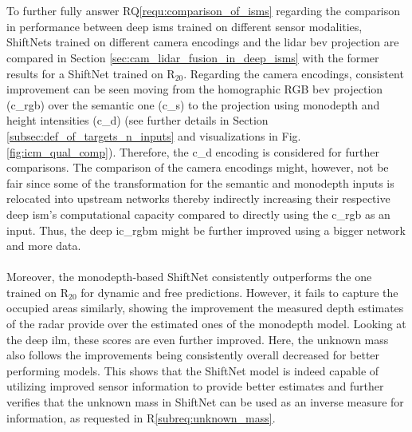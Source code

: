 \\\\
To further fully answer RQ\ref{requ:comparison_of_isms} regarding the comparison in performance between deep \gls{ism}s trained on different sensor modalities, ShiftNets trained on different camera encodings and the lidar \gls{bev} projection are compared in Section \ref{sec:cam_lidar_fusion_in_deep_isms} with the former results for a ShiftNet trained on R$_{20}$. Regarding the camera encodings, consistent improvement can be seen moving from the homographic RGB \gls{bev} projection (\gls{c_rgb}) over the semantic one (\gls{c_s}) to the projection using \gls{monodepth} and height intensities (\gls{c_d}) (see further details in Section \ref{subsec:def_of_targets_n_inputs} and visualizations in Fig. \ref{fig:icm_qual_comp}). Therefore, the \gls{c_d} encoding is considered for further comparisons. The comparison of the camera encodings might, however, not be fair since some of the transformation for the semantic and \gls{monodepth} inputs is relocated into upstream networks thereby indirectly increasing their respective deep \gls{ism}'s computational capacity compared to directly using the \gls{c_rgb} as an input. Thus, the deep \gls{ic_rgbm} might be further improved using a bigger network and more data.
\\\\
Moreover, the \gls{monodepth}-based ShiftNet consistently outperforms the one trained on R$_{20}$ for dynamic and free predictions. However, it fails to capture the occupied areas similarly, showing the improvement the measured depth estimates of the radar provide over the estimated ones of the \gls{monodepth} model. Looking at the deep \gls{ilm}, these scores are even further improved. Here, the unknown mass also follows the improvements being consistently overall decreased for better performing models. This shows that the ShiftNet model is indeed capable of utilizing improved sensor information to provide better estimates and further verifies that the unknown mass in ShiftNet can be used as an inverse measure for information, as requested in R\ref{subreq:unknown_mass}.
\\\\ 
